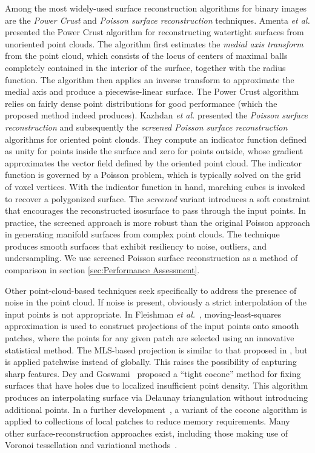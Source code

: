 Among the most widely-used surface reconstruction algorithms for binary images are the \textit{Power Crust} and \textit{Poisson surface reconstruction} techniques. Amenta \textit{et al.} \cite{amenta_2001} presented the Power Crust algorithm for reconstructing watertight surfaces from unoriented point clouds. The algorithm first estimates the \textit{medial axis transform} from the point cloud, which consists of the locus of centers of maximal balls completely contained in the interior of the surface, together with the radius function. The algorithm then applies an inverse transform to approximate the medial axis and produce a piecewise-linear surface. The Power Crust algorithm relies on fairly dense point distributions for good performance (which the proposed method indeed produces). Kazhdan \textit{et al.} presented the \textit{Poisson surface reconstruction} \cite{kazhdan_2008} and subsequently the \textit{screened Poisson surface reconstruction} \cite{kazhdan_2013} algorithms for oriented point clouds. They compute an indicator function defined as unity for points inside the surface and zero for points outside, whose gradient approximates the vector field defined by the oriented point cloud. The indicator function is governed by a Poisson problem, which is typically solved on the grid of voxel vertices.  With the indicator function in hand, marching cubes is invoked to recover a polygonized surface.  The \textit{screened} variant introduces a soft constraint that encourages the reconstructed isosurface to pass through the input points. In practice, the screened approach is more robust than the original Poisson approach in generating manifold surfaces from complex point clouds. The technique produces smooth surfaces that exhibit resiliency to noise, outliers, and undersampling. We use screened Poisson surface reconstruction as a method of comparison in section \ref{sec:Performance Assessment}.

Other point-cloud-based techniques seek specifically to address the presence of noise in the point cloud.  If noise is present, obviously a strict interpolation of the input points is not appropriate.  In Fleishman \textit{et al.}~\cite{fleishman2005}, moving-least-squares approximation is used to construct projections of the input points onto smooth patches, where the points for any given patch are selected using an innovative statistical method.  The MLS-based projection is similar to that proposed in \cite{levin2004}, but is applied patchwise instead of globally.  This raises the possibility of capturing sharp features. Dey and Goswami~\cite{dey2003} proposed a ``tight cocone'' method for fixing surfaces that have holes due to localized insufficient point density.  This algorithm produces an interpolating surface via Delaunay triangulation without introducing additional points.  In a further development~\cite{dey2011}, a variant of the cocone algorithm is applied to collections of local patches to reduce memory requirements.  Many other surface-reconstruction approaches exist, including those making use of Voronoi tessellation and variational methods~\cite{berger}.

